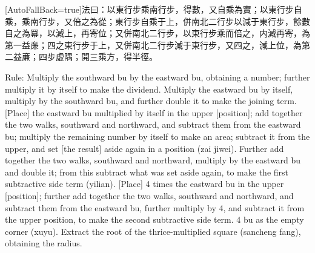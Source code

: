 \documentclass[11pt]{article}
\newcommand{\unitlabel}[1]{\marginpar{\raggedleft\tiny\color{gray}#1}}
\newenvironment{unitzh}{\par\CJKfontspec{Noto Serif CJK SC}[AutoFallBack=true]\large\linespread{1.25}\selectfont}{\par}
\newenvironment{uniten}{\par\small\color{black!85}}{\par\medskip}
\begin{document}
\begin{unitzh}\unitlabel{ceyuan-030.23}法曰：以東行步乘南行步，得數，又自乘為實；以東行步自乘，乘南行步，又倍之為從；東行步自乘于上，併南北二行步以減于東行步，餘數自之為冪，以減上，再寄位；又併南北二行步，以東行步乘而倍之，内減再寄，為第一益亷；四之東行步于上，又併南北二行步減于東行步，又四之，減上位，為第二益亷；四步虚隅；開三乘方，得半徑。\end{unitzh}
\begin{uniten}Rule: Multiply the southward bu by the eastward bu, obtaining a number; further multiply it by itself to make the dividend. Multiply the eastward bu by itself, multiply by the southward bu, and further double it to make the joining term. [Place] the eastward bu multiplied by itself in the upper [position]; add together the two walks, southward and northward, and subtract them from the eastward bu; multiply the remaining number by itself to make an area; subtract it from the upper, and set [the result] aside again in a position (zai jiwei). Further add together the two walks, southward and northward, multiply by the eastward bu and double it; from this subtract what was set aside again, to make the first subtractive side term (yilian). [Place] 4 times the eastward bu in the upper [position]; further add together the two walks, southward and northward, and subtract them from the eastward bu, further multiply by 4, and subtract it from the upper position, to make the second subtractive side term. 4 bu as the empty corner (xuyu). Extract the root of the thrice-multiplied square (sancheng fang), obtaining the radius.\end{uniten}
\end{document}
